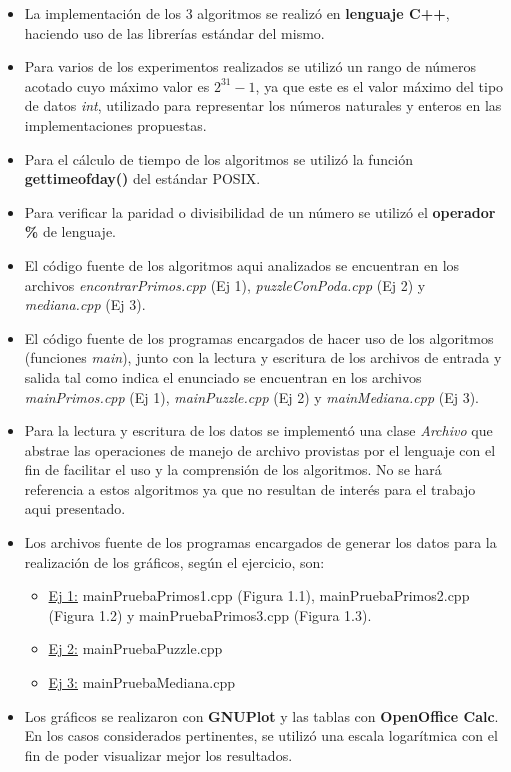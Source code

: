 \documentclass[a4paper,10pt] {article}
\begin{document}
\begin{itemize}
 \item La implementaci\'on de los 3 algoritmos se realiz\'o en \textbf{lenguaje C++}, haciendo uso de las librer\'ias est\'andar del mismo.
 \item Para varios de los experimentos realizados se utiliz\'o un rango de n\'umeros acotado cuyo m\'aximo valor es $2^{31}-1$, ya que este es el valor m\'aximo del tipo de datos \textit{int}, utilizado para representar los n\'umeros naturales y enteros en las implementaciones propuestas.
 \item Para el c\'alculo de tiempo de los algoritmos se utiliz\'o la funci\'on \textbf{gettimeofday()} del est\'andar POSIX.
 \item Para verificar la paridad o divisibilidad de un n\'umero se utiliz\'o el \textbf{operador \%} de lenguaje.
 \item El c\'odigo fuente de los algoritmos aqui analizados se encuentran en los archivos \textit{encontrarPrimos.cpp} (Ej 1), \textit{puzzleConPoda.cpp} (Ej 2) y \textit{mediana.cpp} (Ej 3).
 \item El c\'odigo fuente de los programas encargados de hacer uso de los algoritmos (funciones \textit{main}), junto con la lectura y escritura de los archivos de entrada y salida tal como indica el enunciado se encuentran en los archivos \textit{mainPrimos.cpp} (Ej 1), \textit{mainPuzzle.cpp} (Ej 2) y \textit{mainMediana.cpp} (Ej 3). 
 \item Para la lectura y escritura de los datos se implement\'o una clase \textit{Archivo} que abstrae las operaciones de manejo de archivo provistas por el lenguaje con el fin de facilitar el uso y la comprensi\'on de los algoritmos. No se har\'a referencia a estos algoritmos ya que no resultan de inter\'es para el trabajo aqui presentado.
 \item Los archivos fuente de los programas encargados de generar los datos para la realizaci\'on de los gr\'aficos, seg\'un el ejercicio, son:
  \begin{itemize}
    \item \underline{Ej 1:} mainPruebaPrimos1.cpp (Figura 1.1), mainPruebaPrimos2.cpp (Figura 1.2) y mainPruebaPrimos3.cpp (Figura 1.3).
    \item \underline{Ej 2:} mainPruebaPuzzle.cpp
    \item \underline{Ej 3:} mainPruebaMediana.cpp
  \end{itemize}
 \item Los gr\'aficos se realizaron con \textbf{GNUPlot} y las tablas con \textbf{OpenOffice Calc}. En los casos considerados pertinentes, se utiliz\'o una escala logar\'itmica con el fin de poder visualizar mejor los resultados.
\end{itemize}
\end{document}
